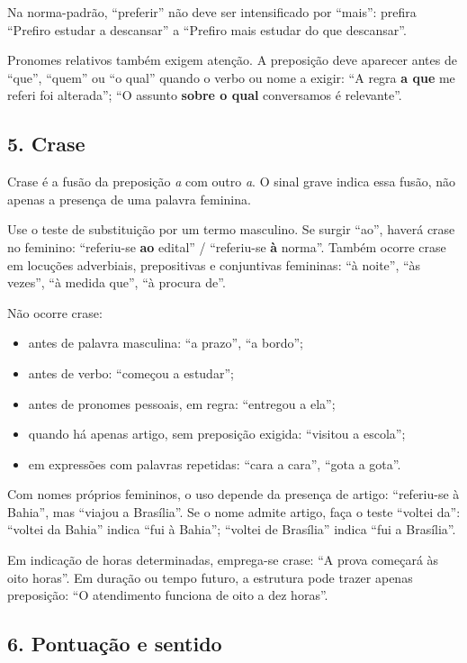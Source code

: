 \documentclass[11pt,a4paper]{article}
\begin{document}
Na norma-padrão, “preferir” não deve ser intensificado por “mais”: prefira “Prefiro estudar a descansar” a “Prefiro mais estudar do que descansar”.

Pronomes relativos também exigem atenção. A preposição deve aparecer antes de “que”, “quem” ou “o qual” quando o verbo ou nome a exigir: “A regra \textbf{a que} me referi foi alterada”; “O assunto \textbf{sobre o qual} conversamos é relevante”.

\subsection*{5. Crase}

Crase é a fusão da preposição \textit{a} com outro \textit{a}. O sinal grave indica essa fusão, não apenas a presença de uma palavra feminina.

Use o teste de substituição por um termo masculino. Se surgir “ao”, haverá crase no feminino: “referiu-se \textbf{ao} edital” / “referiu-se \textbf{à} norma”. Também ocorre crase em locuções adverbiais, prepositivas e conjuntivas femininas: “à noite”, “às vezes”, “à medida que”, “à procura de”.

Não ocorre crase:

\begin{itemize}
  \item antes de palavra masculina: “a prazo”, “a bordo”;
  \item antes de verbo: “começou a estudar”;
  \item antes de pronomes pessoais, em regra: “entregou a ela”;
  \item quando há apenas artigo, sem preposição exigida: “visitou a escola”;
  \item em expressões com palavras repetidas: “cara a cara”, “gota a gota”.
\end{itemize}

Com nomes próprios femininos, o uso depende da presença de artigo: “referiu-se à Bahia”, mas “viajou a Brasília”. Se o nome admite artigo, faça o teste “voltei da”: “voltei da Bahia” indica “fui à Bahia”; “voltei de Brasília” indica “fui a Brasília”.

Em indicação de horas determinadas, emprega-se crase: “A prova começará às oito horas”. Em duração ou tempo futuro, a estrutura pode trazer apenas preposição: “O atendimento funciona de oito a dez horas”.

\subsection*{6. Pontuação e sentido}
\end{document}
